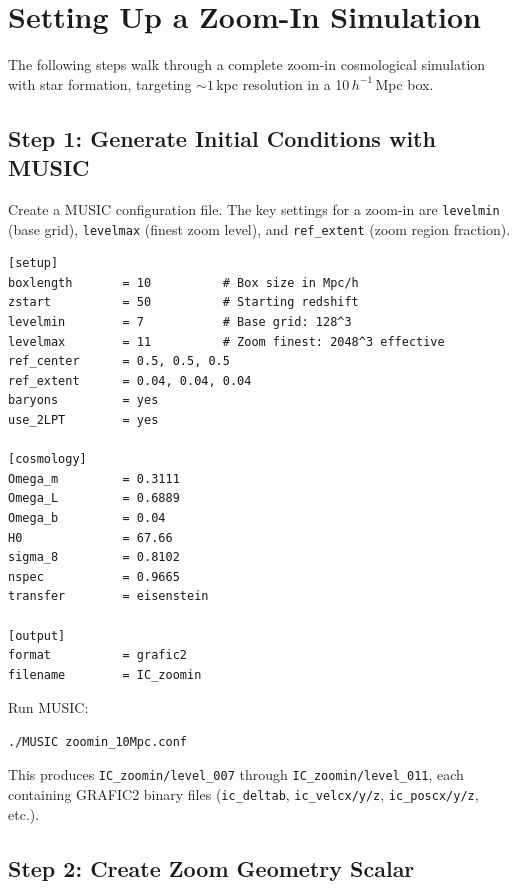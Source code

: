 \documentclass[11pt,fleqn]{book}
\begin{document}
\section{Setting Up a Zoom-In Simulation}

The following steps walk through a complete zoom-in cosmological simulation with star formation, targeting ${\sim}1$\,kpc resolution in a 10\,$h^{-1}$\,Mpc box.

\subsection{Step 1: Generate Initial Conditions with MUSIC}

Create a MUSIC configuration file. The key settings for a zoom-in are \texttt{levelmin} (base grid), \texttt{levelmax} (finest zoom level), and \texttt{ref\_extent} (zoom region fraction).

\begin{codebox}
\begin{lstlisting}[style=bash,numbers=none]
[setup]
boxlength       = 10          # Box size in Mpc/h
zstart          = 50          # Starting redshift
levelmin        = 7           # Base grid: 128^3
levelmax        = 11          # Zoom finest: 2048^3 effective
ref_center      = 0.5, 0.5, 0.5
ref_extent      = 0.04, 0.04, 0.04
baryons         = yes
use_2LPT        = yes

[cosmology]
Omega_m         = 0.3111
Omega_L         = 0.6889
Omega_b         = 0.04
H0              = 67.66
sigma_8         = 0.8102
nspec           = 0.9665
transfer        = eisenstein

[output]
format          = grafic2
filename        = IC_zoomin
\end{lstlisting}
\end{codebox}

Run MUSIC:
\begin{codebox}
\begin{lstlisting}[style=bash,numbers=none]
./MUSIC zoomin_10Mpc.conf
\end{lstlisting}
\end{codebox}

This produces \texttt{IC\_zoomin/level\_007} through \texttt{IC\_zoomin/level\_011}, each containing GRAFIC2 binary files (\texttt{ic\_deltab}, \texttt{ic\_velcx/y/z}, \texttt{ic\_poscx/y/z}, etc.).

\subsection{Step 2: Create Zoom Geometry Scalar}
\end{document}
